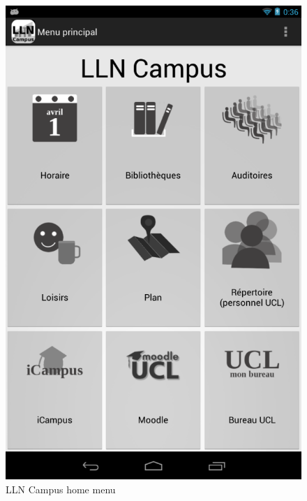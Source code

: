 \documentclass[11pt, a4paper]{report}
\begin{document}
\begin{figure}
\centering
\includegraphics[scale = 0.2]{Images/llncampus.png}
\caption{LLN Campus home menu}
\end{figure}
\end{document}
